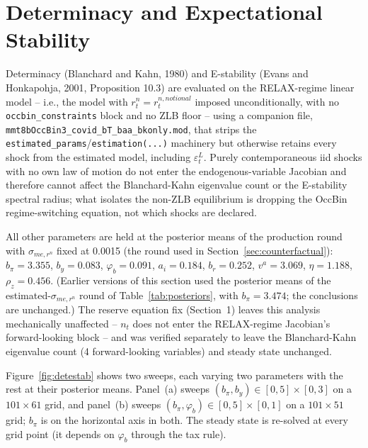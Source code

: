 \documentclass[11pt]{article}
\begin{document}
\section{Determinacy and Expectational Stability}
\label{sec:detestab}

Determinacy (Blanchard and Kahn, 1980) and E-stability (Evans and
Honkapohja, 2001, Proposition 10.3) are evaluated on the RELAX-regime
linear model -- i.e., the model with $r^n_t = r^{n,notional}_t$ imposed
unconditionally, with no \texttt{occbin\_constraints} block and no ZLB
floor -- using a companion file,
\texttt{mmt8bOccBin3\_covid\_bT\_baa\_bkonly.mod}, that strips the
\texttt{estimated\_params}/\texttt{estimation(...)} machinery but
otherwise retains every shock from the estimated model, including
$\varepsilon^L_t$. Purely contemporaneous iid shocks with no own law of
motion do not enter the endogenous-variable Jacobian and therefore
cannot affect the Blanchard-Kahn eigenvalue count or the E-stability
spectral radius; what isolates the non-ZLB equilibrium is dropping the
OccBin regime-switching equation, not which shocks are declared.

All other parameters are held at the posterior means of the production
round with $\sigma_{me,r^n}$ fixed at 0.0015 (the round used in
Section~\ref{sec:counterfactual}): $b_\pi=3.355$, $b_y=0.083$,
$\varphi_b=0.091$, $a_i=0.184$, $b_r=0.252$, $v^a=3.069$, $\eta=1.188$,
$\rho_z=0.456$. (Earlier versions of this section used the posterior means of
the estimated-$\sigma_{me,r^n}$ round of Table~\ref{tab:posteriors}, with
$b_\pi=3.474$; the conclusions are unchanged.) The reserve
equation fix (Section~1) leaves this analysis mechanically unaffected --
$n_t$ does not enter the RELAX-regime Jacobian's forward-looking block
-- and was verified separately to leave the Blanchard-Kahn eigenvalue
count (4 forward-looking variables) and steady state unchanged.

Figure~\ref{fig:detestab} shows two sweeps, each varying two parameters with
the rest at their posterior means. Panel~(a) sweeps
$(b_\pi, b_y) \in [0,5]\times[0,3]$ on a $101\times 61$ grid, and panel~(b)
sweeps $(b_\pi, \varphi_b) \in [0,5]\times[0,1]$ on a $101\times 51$ grid;
$b_\pi$ is on the horizontal axis in both. The steady state is re-solved at
every grid point (it depends on $\varphi_b$ through the tax rule).
\end{document}
